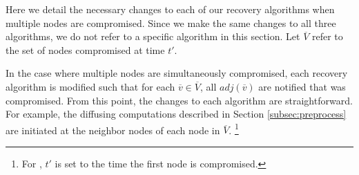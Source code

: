 Here we detail the necessary changes to each of our recovery algorithms when multiple nodes are compromised. Since we make the same changes to all three algorithms, we do not refer 
to a specific algorithm in this section. Let $\overline{V}$ refer to the set of nodes compromised at time $t'$. 

In the case where multiple nodes are simultaneously compromised, each recovery algorithm is modified such that for each $\overline{v} \in \overline{V}$, all $adj(\overline{v})$
are notified that \bad was compromised. 
From this point, the changes to each algorithm are straightforward.  For example,
the diffusing computations described in Section  \ref{subsec:preprocess} are initiated at the neighbor nodes of each node in $\overline{V}$.
{\footnote {\small For \cprs, $t'$ is set to the time the first node is compromised.}}


